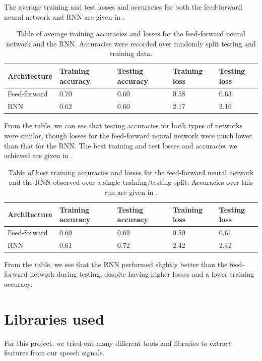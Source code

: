 \documentclass{article}
\begin{document}
The average training and test losses and accuracies for both the feed-forward neural network and RNN are given in .
\begin{table}[ht]
	\centering
	\begin{tabularx}{\linewidth}{|X|X|X|X|X|}
		\hline
		Ar\-chi\-tec\-ture & Training accuracy & Testing accuracy & Training loss & Testing loss \\
		\hline
		Feed-forward & 0.70 & 0.60 & 0.58 & 0.63 \\
		\hline
		RNN & 0.62 & 0.60 & 2.17 & 2.16 \\
		\hline
	\end{tabularx}
	\caption{Table of average training accuracies and losses for the feed-forward neural network and the RNN. Accuracies were recorded over randomly split testing and training data.}
	\label{tab:avg_acc}
\end{table}
From the table, we can see that testing accuracies for both types of networks were similar, though losses for the feed-forward neural network were much lower than that for the RNN.
The best training and test losses and accuracies we achieved are given in .
\begin{table}[!ht]
	\centering
	\begin{tabularx}{\linewidth}{|X|X|X|X|X|}
		\hline
		Ar\-chi\-tec\-ture & Training accuracy & Testing accuracy & Training loss & Testing loss \\
		\hline
		Feed-forward & 0.69 & 0.69 & 0.59 & 0.61 \\
		\hline
		RNN & 0.61 & 0.72 & 2.42 & 2.42 \\
		\hline
	\end{tabularx}
	\caption{Table of best training accuracies and losses for the feed-forward neural network and the RNN observed over a single training/testing split. Accuracies over this run are given in .}
	\label{tab:best_acc}
\end{table}
From the table, we see that the RNN performed slightly better than the feed-forward network during testing, despite having higher losses and a lower training accuracy.

\section{Libraries used}
\label{sec:libraries}

For this project, we tried out many different tools and libraries to extract features from our speech signals.
\end{document}
